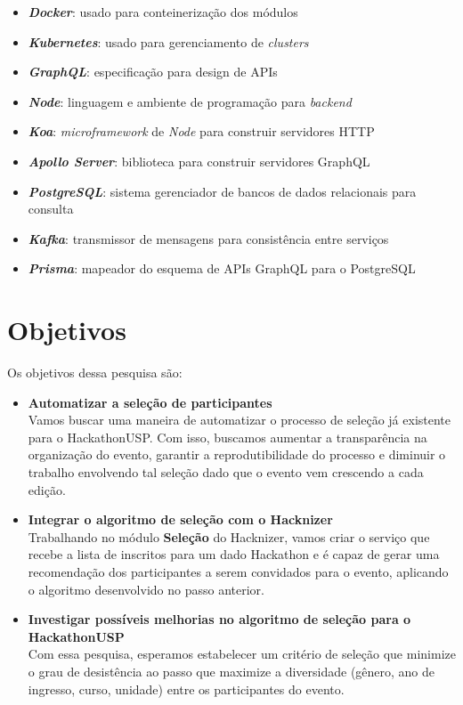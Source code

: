 \documentclass[10pt,twoside,a4paper]{article}
\begin{document}
    \begin{itemize}
        \item \textbf{\textit{Docker}}: usado para conteinerização dos módulos
        \item \textbf{\textit{Kubernetes}}: usado para gerenciamento de \textit{clusters}
        \item \textbf{\textit{GraphQL}}: especificação para design de APIs
        \item \textbf{\textit{Node}}: linguagem e ambiente de programação para \textit{backend}
        \item \textbf{\textit{Koa}}: \textit{microframework} de \textit{Node} para construir servidores HTTP
        \item \textbf{\textit{Apollo Server}}: biblioteca para construir servidores GraphQL
        \item \textbf{\textit{PostgreSQL}}: sistema gerenciador de bancos de dados relacionais para consulta
        \item \textbf{\textit{Kafka}}: transmissor de mensagens para consistência entre serviços
        \item \textbf{\textit{Prisma}}: mapeador do esquema de APIs GraphQL para o PostgreSQL
    \end{itemize}
    
  

\section{Objetivos}

    Os objetivos dessa pesquisa são:
    \begin{itemize}
        \item \textbf{Automatizar a seleção de participantes}\\
          Vamos buscar uma maneira de automatizar o processo de seleção já existente para o HackathonUSP. Com isso, buscamos aumentar a transparência na organização do evento, garantir a reprodutibilidade do processo e diminuir o trabalho envolvendo tal seleção dado que o evento vem crescendo a cada edição.
        
        \item \textbf{Integrar o algoritmo de seleção com o Hacknizer}\\
          Trabalhando no módulo \textbf{Seleção} do Hacknizer, vamos criar o serviço que recebe a lista de inscritos para um dado Hackathon e é capaz de gerar uma recomendação dos participantes a serem convidados para o evento, aplicando o algoritmo desenvolvido no passo anterior.
        
        \item \textbf{Investigar possíveis melhorias no algoritmo de seleção para o HackathonUSP}\\
          Com essa pesquisa, esperamos estabelecer um critério de seleção que minimize o grau de desistência ao passo que maximize a diversidade (gênero, ano de ingresso, curso, unidade) entre os participantes do evento.
    \end{itemize}
    
\end{document}
